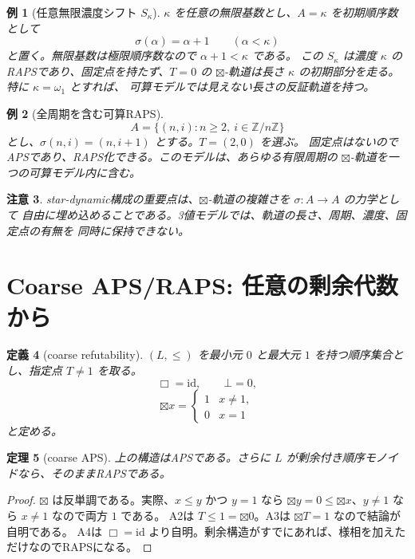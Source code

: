 \documentclass[uplatex,dvipdfmx,a4paper,10pt]{jsarticle}
\newtheorem{theorem}{定理}
\newtheorem{definition}[theorem]{定義}
\newtheorem{example}[theorem]{例}
\newtheorem{remark}[theorem]{注意}
\newcommand{\bt}{\boxtimes}
\begin{document}
\begin{example}[任意無限濃度シフト \(S_\kappa\)]
\(\kappa\) を任意の無限基数とし、\(A=\kappa\) を初期順序数として
\[
\sigma(\alpha)=\alpha+1\qquad(\alpha<\kappa)
\]
と置く。無限基数は極限順序数なので \(\alpha+1<\kappa\) である。
この \(S_\kappa\) は濃度 \(\kappa\) のRAPSであり、固定点を持たず、\(T=0\) の
\(\bt\)-軌道は長さ \(\kappa\) の初期部分を走る。特に \(\kappa=\omega_1\) とすれば、
可算モデルでは見えない長さの反証軌道を持つ。
\end{example}

\begin{example}[全周期を含む可算RAPS]
\[
A=\{(n,i):n\ge2,\ i\in\mathbb Z/n\mathbb Z\}
\]
とし、\(\sigma(n,i)=(n,i+1)\) とする。\(T=(2,0)\) を選ぶ。
固定点はないのでAPSであり、RAPS化できる。このモデルは、あらゆる有限周期の
\(\bt\)-軌道を一つの可算モデル内に含む。
\end{example}

\begin{remark}
star-dynamic構成の重要点は、\(\bt\)-軌道の複雑さを \(\sigma:A\to A\) の力学として
自由に埋め込めることである。3値モデルでは、軌道の長さ、周期、濃度、固定点の有無を
同時に保持できない。
\end{remark}

\section{Coarse APS/RAPS: 任意の剰余代数から}

\begin{definition}[coarse refutability]
\((L,\le)\) を最小元 \(0\) と最大元 \(1\) を持つ順序集合とし、指定点 \(T\ne1\) を取る。
\[
\Box=\mathrm{id},\qquad
\bot=0,
\]
\[
\bt x=
\begin{cases}
1 & x\ne1,\\
0 & x=1
\end{cases}
\]
と定める。
\end{definition}

\begin{theorem}[coarse APS]
上の構造はAPSである。さらに \(L\) が剰余付き順序モノイドなら、そのままRAPSである。
\end{theorem}

\begin{proof}
\(\bt\) は反単調である。実際、\(x\le y\) かつ \(y=1\) なら
\(\bt y=0\le\bt x\)、\(y\ne1\) なら \(x\ne1\) なので両方 \(1\) である。
A2は \(T\le1=\bt0\)。A3は \(\bt T=1\) なので結論が自明である。
A4は \(\Box=\mathrm{id}\) より自明。剰余構造がすでにあれば、様相を加えただけなのでRAPSになる。
\end{proof}
\end{document}
